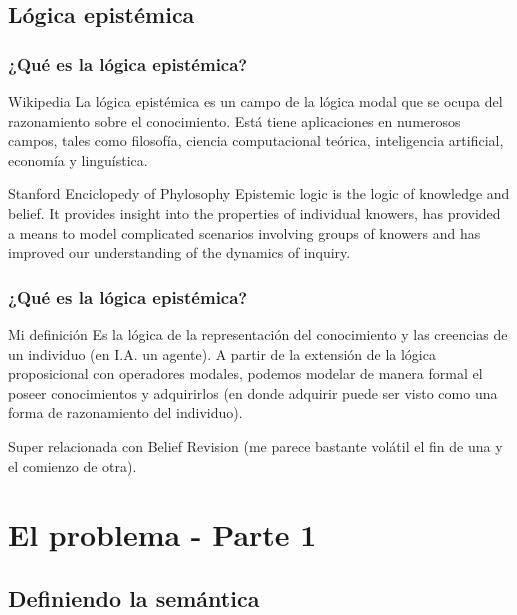 \documentclass{beamer}
\begin{document}
\subsection{L\'ogica epist\'emica}

\begin{frame}
\frametitle{¿Qu\'e es la l\'ogica epist\'emica?}
\begin{block}{Wikipedia}
La l\'ogica epist\'emica es un campo de la l\'ogica modal que se ocupa del razonamiento sobre el conocimiento. Est\'a tiene aplicaciones en numerosos campos, tales como filosof\'ia, ciencia computacional te\'orica, inteligencia artificial, econom\'ia y lingu\'istica.
\end{block}

\begin{block}{Stanford Enciclopedy of Phylosophy}
Epistemic logic is the logic of knowledge and belief. It provides insight into the properties of individual knowers, has provided a means to model complicated scenarios involving groups of knowers and has improved our understanding of the dynamics of inquiry. 
\end{block}

\end{frame}

\begin{frame}
\frametitle{¿Qu\'e es la l\'ogica epist\'emica?}
\begin{block}{Mi definici\'on}
Es la l\'ogica de la representaci\'on del conocimiento y las creencias de un individuo (en I.A. un agente). 
A partir de la extensi\'on de la l\'ogica proposicional con operadores modales, podemos modelar de manera formal el poseer conocimientos y adquirirlos (en donde adquirir puede ser visto como una forma de razonamiento del individuo).
\end{block}

Super relacionada con Belief Revision (me parece bastante vol\'atil el fin de una y el comienzo de otra).
\end{frame}

\section{El problema - Parte 1}

\subsection{Definiendo la sem\'antica}
\end{document}
